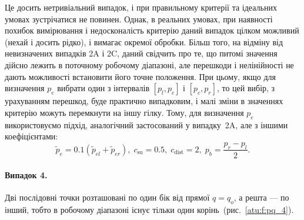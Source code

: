 Це досить нетривіальний випадок, і при правильному критерії
та ідеальних умовах зустрічатися не повинен. Однак, в реальних
умовах, при наявності похибок вимірювання і недосконалість критерію
даний випадок цілком можливий (нехай і досить рідко), і вимагає
окремої обробки. Більш того, на відміну від невизначених
випадків 2A і 2C, даний свідчить про те, що питомі значення дійсно
лежить в поточному робочому діапазоні, але перешкоди і
нелінійності не дають можливості встановити його точне
положення. При цьому, якщо для визначення
$ p_e $ вибрати один з інтервалів
$ [p_l, p_c] $ і
$ [p_c, p_r] $, то цей вибір, з урахуванням перешкод, буде практично
випадковим, і малі зміни в значеннях критерію можуть перемкнути
на іншу гілку. Тому, для визначення
$ p_e $ використовуємо підхід, аналогічний застосований у випадку~2A,
але з іншими коефіцієнтами:
%
\begin{equation}
  \tilde{p}_e = 0.1 ( \tilde{p}_{el} + \tilde{p}_{er} ),
  \;
  c_\mathrm{su} = 0.5, \;  c_\mathrm{dist} = 2, \;   p_b = \frac{p_r - p_l}{2}.
  \label{atu:eq:pr_e_3}
\end{equation}


\paragraph{Випадок 4.}
%
Дві послідовні точки
розташовані по один бік
від прямої
$q = q_o$, а решта --- по інший, тобто в робочому діапазоні існує тільки один
корінь~(рис.~\ref{atu:f:pq_4}).


